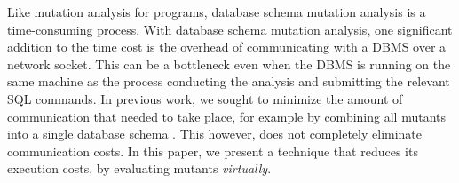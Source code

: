 Like mutation analysis for programs, database schema mutation analysis is a time-consuming process. With database schema mutation analysis, one significant addition to the time cost is the overhead of communicating with a DBMS over a network socket. This can be a bottleneck even when the DBMS is running on the same machine as the process conducting the analysis and submitting the relevant SQL commands. In previous work, we sought to minimize the amount of communication that needed to take place, for example by combining all mutants into a single database schema \cite{Wright2013}. This however, does not completely eliminate communication costs. In this paper, we present a technique that reduces its execution costs, by evaluating mutants {\it virtually}.


